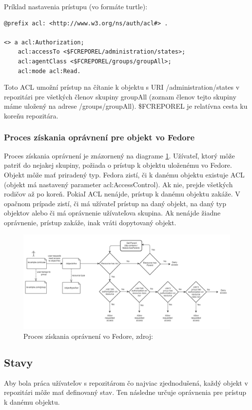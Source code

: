 \documentclass[thesis=M,slovak]{FITthesis}[2013/05/06]
\begin{document}
Príklad nastavenia prístupu (vo formáte turtle):
\begin{lstlisting}[frame=single] 
@prefix acl: <http://www.w3.org/ns/auth/acl#> .

<> a acl:Authorization;
    acl:accessTo <$FCREPOREL/administration/states>;
    acl:agentClass <$FCREPOREL/groups/groupAll>;
    acl:mode acl:Read.
\end{lstlisting}
Toto ACL umožní prístup na čítanie k objektu s URI /administration/states v repozitári pre všetkých členov skupiny groupAll (zoznam členov tejto skupiny máme uložený na adrese /groups/groupAll). \$FCREPOREL je relatívna cesta ku koreňu repozitára.

\subsubsection{Proces získania oprávnení pre objekt vo Fedore}
Proces získania oprávnení je znázornený na diagrame \ref{graphics:ACLFedoraFlow}. Užívateľ, ktorý môže patriť do nejakej skupiny, požiada o prístup k objektu uloženému vo Fedore. Objekt môže mať priradený typ. Fedora zistí, či k danému objektu existuje ACL (objekt má nastavený parameter acl:AccessControl). Ak nie, prejde všetkých rodičov až po koreň. Pokiaľ ACL nenájde, prístup k danému objektu zakáže.
V opačnom prípade zistí, či má užívateľ prístup na daný objekt, na daný typ objektov alebo či má oprávnenie užívateľova skupina. Ak nenájde žiadne oprávnenie, prístup zakáže, inak vráti dopytovaný objekt.

\begin{figure}\centering
	\includegraphics[width=1.0\textwidth]{stavy/ACLFedoraFlow.png}
 	\caption[Proces získania oprávnení vo Fedore]{Proces získania oprávnení vo Fedore, zdroj: \cite{FedoraACL}}\label{graphics:ACLFedoraFlow}
\end{figure}

\subsection{Stavy}
Aby bola práca užívateľov s repozitárom čo najviac zjednodušená, každý objekt v repozitári môže mať definovaný stav. Ten následne určuje oprávnenia pre prístup k danému objektu.
\end{document}
